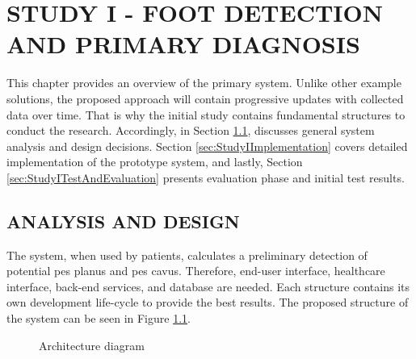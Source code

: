 \chapter{STUDY I - FOOT DETECTION AND PRIMARY DIAGNOSIS}\label{chp:Foot Detection & Primary Diagnosis}

This chapter provides an overview of the primary system. Unlike other example solutions, the proposed approach will contain progressive updates with collected data over time. That is why the initial study contains fundamental structures to conduct the research. Accordingly, in Section \ref{sec:StudyIAnalysisAndDesign}, discusses  general system analysis and design decisions. Section \ref{sec:StudyIImplementation} covers detailed implementation of the prototype system, and lastly, Section \ref{sec:StudyITestAndEvaluation} presents evaluation phase and initial test results.

\section{ANALYSIS AND DESIGN}\label{sec:StudyIAnalysisAndDesign}

The system, when used by patients, calculates a preliminary detection of potential pes planus and pes cavus. Therefore, end-user interface, healthcare interface, back-end services, and database are needed. Each structure contains its own development life-cycle to provide the best results. The proposed structure of the system can be seen in Figure \ref{fig:GeneralArchitectureDiagram}.

\begin{figure}[htbp]
\centering
{}
\caption{Architecture diagram}
\label{fig:GeneralArchitectureDiagram}
\end{figure}

